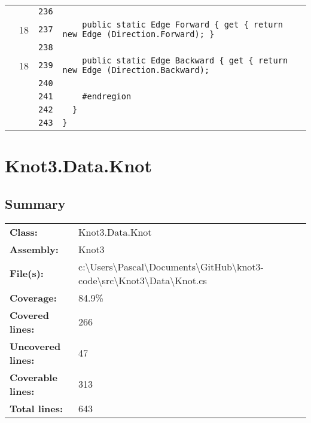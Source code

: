 \documentclass[a4paper,10pt]{article}
\begin{document}
\begin{longtable}[l]{lrrl}
\cellcolor{gray} &  & \verb~236~ & \verb~~\\
\cellcolor{green} & 18 & \verb~237~ & \verb~    public static Edge Forward { get { return new Edge (Direction.Forward); } ~\\
\cellcolor{gray} &  & \verb~238~ & \verb~~\\
\cellcolor{green} & 18 & \verb~239~ & \verb~    public static Edge Backward { get { return new Edge (Direction.Backward); ~\\
\cellcolor{gray} &  & \verb~240~ & \verb~~\\
\cellcolor{gray} &  & \verb~241~ & \verb~    #endregion~\\
\cellcolor{gray} &  & \verb~242~ & \verb~  }~\\
\cellcolor{gray} &  & \verb~243~ & \verb~}~\\
\end{longtable}
\newpage
\section{Knot3.Data.Knot}
\subsection{Summary}
\begin{longtable}[l]{ll}
\textbf{Class:} & Knot3.Data.Knot\\
\textbf{Assembly:} & Knot3\\
\textbf{File(s):} & \begin{minipage}[t]{12cm}{c:\textbackslash Users\textbackslash Pascal\textbackslash Documents\textbackslash GitHub\textbackslash knot3-code\textbackslash src\textbackslash Knot3\textbackslash Data\textbackslash Knot.cs}\end{minipage} \\
\textbf{Coverage:} & 84.9\%\\
\textbf{Covered lines:} & 266\\
\textbf{Uncovered lines:} & 47\\
\textbf{Coverable lines:} & 313\\
\textbf{Total lines:} & 643\\
\end{longtable}
\end{document}
